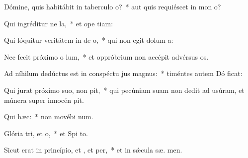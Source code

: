 \item Dómine, quis habitábit in taberculo o?~* aut quis requiéscet in mon  o?
\item Qui ingréditur ne la,~* et ope tiam:
\item Qui lóquitur veritátem in de o,~* qui non egit dolum   a:
\item Nec fecit próximo o lum,~* et oppróbrium non accépit advérsus  os.
\item Ad níhilum dedúctus est in conspéctu jus magnus:~* timéntes autem Dó ficat:
\item Qui jurat próximo suo,  non pit,~* qui pecúniam suam non dedit ad usúram, et múnera super innocén  pit.
\item Qui  hæc:~* non movébi  num.
\item Glória tri, et o,~* et Spi to.
\item Sicut erat in princípio, et , et per,~* et in sǽcula sæ. men.

